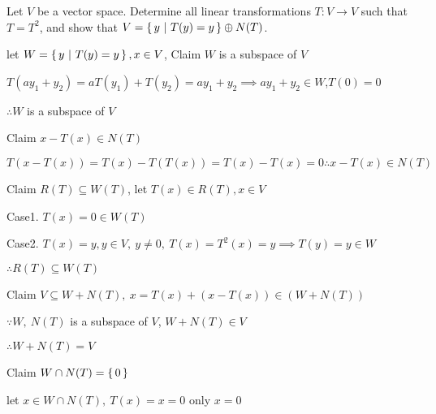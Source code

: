 Let $V$ be a vector space. Determine all linear transformations $T: V \rightarrow V$ such that $T = T^2$, and show that $V = \left\{ \,y~|~T(y) = y \,\right\} \oplus N(T)$.

\begin{tcolorbox}
	let $W = \left\{ \,y~|~T(y) =y \,\right\}, x \in V$, Claim $W$ is a subspace of $V$
	
	$T(ay_1 + y_2) = aT(y_1) + T(y_2) = ay_1 + y_2 \implies ay_1 + y_2 \in W$,$T(0) = 0$
	
	$\therefore W$ is a subspace of $V$
	
	Claim $x -T(x) \in N(T)$
	
	$T(x-T(x)) = T(x) - T(T(x)) = T(x) - T(x) = 0 \therefore x - T(x) \in N(T)$
	
	Claim $R(T) \subseteq W(T)$, let $T(x) \in R(T), x \in V$
	
	Case1. $T(x) = 0 \in W(T)$
	
	Case2. $T(x) = y, y \in V,~ y \neq 0,~ T(x) = T^2(x) = y \implies T(y) = y \in W$
	
	$\therefore R(T) \subseteq W(T)$
	
	Claim $V \subseteq W + N(T),~ x = T(x) + ( x - T(x)) \in (W + N(T))$
	
	$\because W,~ N(T)$ is a subspace of $V$, $W + N(T) \in V$
	
	$\therefore W + N(T) = V$
	
	Claim $W \cap N(T) = \left\{ \,0 \,\right\}$
	
	let $x \in W \cap N(T),~T(x)=x=0$ only $x = 0$
	
		
\end{tcolorbox}